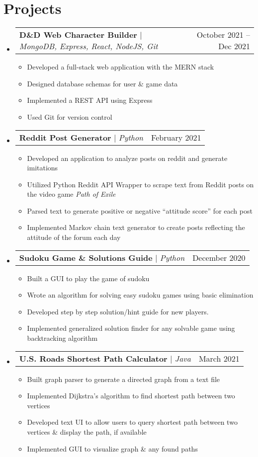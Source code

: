 \documentclass[letterpaper,11pt]{article}
\makeatletter
\newcommand{\resumeItem}[1]{
  \item\small{
    {#1 \vspace{-2pt}}
  }
}
\newcommand{\resumeProjectHeading}[2]{
    \item
    \begin{tabular*}{0.97\textwidth}{l@{\extracolsep{\fill}}r}
      \small#1 & #2 \\
    \end{tabular*}\vspace{-7pt}
}
\newcommand{\resumeSubHeadingListStart}{\begin{itemize}[leftmargin=0.15in, label={}]}
\newcommand{\resumeSubHeadingListEnd}{\end{itemize}}
\newcommand{\resumeItemListStart}{\begin{itemize}}
\newcommand{\resumeItemListEnd}{\end{itemize}\vspace{-5pt}}
\makeatother
\begin{document}
\section{Projects}
    \resumeSubHeadingListStart
      \resumeProjectHeading
          {\textbf{D\&D Web Character Builder} $|$ \emph{MongoDB, Express, React, NodeJS, Git}}{October 2021 -- Dec 2021}
          \resumeItemListStart
            \resumeItem{Developed a full-stack web application with the MERN stack}
            \resumeItem{Designed database schemas for user \& game data}
            \resumeItem{Implemented a REST API using Express}
            \resumeItem{Used Git for version control}
          \resumeItemListEnd
      \resumeProjectHeading
          {\textbf{Reddit Post Generator} $|$ \emph{Python}}{February 2021}
          \resumeItemListStart
            \resumeItem{Developed an application to analyze posts on reddit and generate imitations}
            \resumeItem{Utilized Python Reddit API Wrapper to scrape text from Reddit posts on the video game \emph{Path of Exile}}
            \resumeItem{Parsed text to generate positive or negative “attitude score” for each post}
            \resumeItem{Implemented Markov chain text generator to create posts reflecting the attitude of the forum each day}
          \resumeItemListEnd
      \resumeProjectHeading
          {\textbf{Sudoku Game \& Solutions Guide} $|$ \emph{Python}}{December 2020}
          \resumeItemListStart
            \resumeItem{Built a GUI to play the game of sudoku}
            \resumeItem{Wrote an algorithm for solving easy sudoku games using basic elimination}
            \resumeItem{Developed step by step solution/hint guide for new players.}
            \resumeItem{Implemented generalized solution finder for any solvable game using backtracking algorithm}
          \resumeItemListEnd
      \resumeProjectHeading
        {\textbf{U.S. Roads Shortest Path Calculator} $|$ \emph{Java}}{March 2021}
        \resumeItemListStart
          \resumeItem{Built graph parser to generate a directed graph from a text file}
          \resumeItem{Implemented Dijkstra’s algorithm to find shortest path between two vertices}
          \resumeItem{Developed text UI to allow users to query shortest path between two vertices \& display the path, if available}
          \resumeItem{Implemented GUI to visualize graph \& any found paths}
        \resumeItemListEnd
    \resumeSubHeadingListEnd



%
\end{document}
